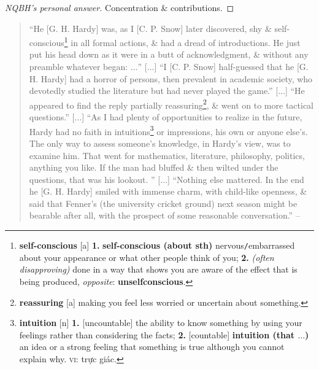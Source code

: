 \documentclass[oneside]{book}
\numberwithin{equation}{section}
\begin{document}
\begin{proof}[NQBH's personal answer]
	Concentration \& contributions.
\end{proof}

\begin{quotation}
	``He [G. H. Hardy] was, as I [C. P. Snow] later discovered, shy \& self-conscious\footnote{\textbf{self-conscious} [a] \textbf{1.} \textbf{self-conscious (about sth)} nervous\texttt{/}embarrassed about your appearance or what other people think of you; \textbf{2.} \textit{(often disapproving)} done in a way that shows you are aware of the effect that is being produced, \textit{opposite}: \textbf{unselfconscious}.} in all formal actions, \& had a dread of introductions. He just put his head down as it were in a butt of acknowledgment, \& without any preamble whatever began: $\ldots$'' [$\ldots$] ``I [C. P. Snow] half-guessed that he [G. H. Hardy] had a horror of persons, then prevalent in academic society, who devotedly studied the literature but had never played the game.'' [$\ldots$] ``He appeared to find the reply partially reassuring\footnote{\textbf{reassuring} [a] making you feel less worried or uncertain about something.}, \& went on to more tactical questions.'' [$\ldots$] ``As I had plenty of opportunities to realize in the future, Hardy had no faith in intuitions\footnote{\textbf{intuition} [n] \textbf{1.} [uncountable] the ability to know something by using your feelings rather than considering the facts; \textbf{2.} [countable] \textbf{intuition (that $\ldots$)} an idea or a strong feeling that something is true although you cannot explain why. \textsc{vi}: trực giác.} or impressions, his own or anyone else's. The only way to assess someone's knowledge, in Hardy's view, was to examine him. That went for mathematics, literature, philosophy, politics, anything you like. If the man had bluffed \& then wilted under the questions, that was his lookout. '' [$\ldots$] ``Nothing else mattered. In the end he [G. H. Hardy] smiled with immense charm, with child-like openness, \& said that Fenner's (the university cricket ground) next season might be bearable after all, with the prospect of some reasonable conversation.'' -- \cite[Foreword, pp. 10--11]{Hardy1992}
	

\end{quotation}
\end{document}
